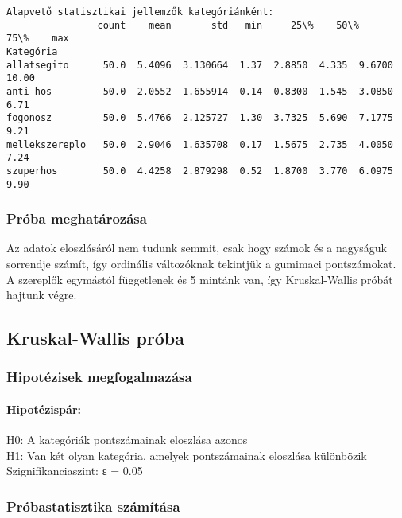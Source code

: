 \documentclass[11pt]{article}
\begin{document}
    \begin{Verbatim}[commandchars=\\\{\}]
Alapvető statisztikai jellemzők kategóriánként:
                count    mean       std   min     25\%    50\%     75\%    max
Kategória
allatsegito      50.0  5.4096  3.130664  1.37  2.8850  4.335  9.6700  10.00
anti-hos         50.0  2.0552  1.655914  0.14  0.8300  1.545  3.0850   6.71
fogonosz         50.0  5.4766  2.125727  1.30  3.7325  5.690  7.1775   9.21
mellekszereplo   50.0  2.9046  1.635708  0.17  1.5675  2.735  4.0050   7.24
szuperhos        50.0  4.4258  2.879298  0.52  1.8700  3.770  6.0975   9.90
    \end{Verbatim}

    \subsubsection{Próba meghatározása}\label{pruxf3ba-meghatuxe1rozuxe1sa}

Az adatok eloszlásáról nem tudunk semmit, csak hogy számok és a
nagyságuk sorrendje számít, így ordinális változóknak tekintjük a
gumimaci pontszámokat. A szereplők egymástól függetlenek és 5 mintánk
van, így Kruskal-Wallis próbát hajtunk végre.

    \subsection{Kruskal-Wallis próba}\label{kruskal-wallis-pruxf3ba}

\subsubsection{Hipotézisek
megfogalmazása}\label{hipotuxe9zisek-megfogalmazuxe1sa}

\paragraph{Hipotézispár:}\label{hipotuxe9zispuxe1r}

H0: A kategóriák pontszámainak eloszlása azonos\\
H1: Van két olyan kategória, amelyek pontszámainak eloszlása
különbözik\\
Szignifikanciaszint: ε = 0.05

\subsubsection{Próbastatisztika
számítása}\label{pruxf3bastatisztika-szuxe1muxedtuxe1sa}
\end{document}
